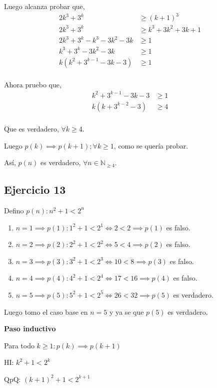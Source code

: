 Luego alcanza probar que,
\begin{align*}
    2k^3 + 3^k &\geq (k+1)^3 \\
    2k^3 + 3^k &\geq k^3 + 3k^2 + 3k + 1 \\
    2k^3 + 3^k - k^3 - 3k^2 - 3k &\geq 1 \\
    k^3 + 3^k - 3k^2 - 3k &\geq 1 \\
    k(k^2 + 3^{k-1} - 3k -3) &\geq 1 \\
\end{align*}

Ahora pruebo que,
\begin{align*}
    k^2 + 3^{k-1} - 3k -3 &\geq 1 \\
    k(k + 3^{k-2} - 3) &\geq 4 \\
\end{align*}

Que es verdadero, $\forall k \geq 4$.

Luego $p(k) \implies p(k+1); \forall k \geq 1$, como se quería probar.

Así, $p(n)$ es verdadero, $\forall n \in \mathbb{N}_{\geq 4}$.

\subsection{Ejercicio 13}

Defino $ p(n): n^2 +1 < 2^n$

\begin{enumerate}
    \item[] $ n= 1 \implies p(1): 1^2 + 1<2^1 \iff 2<2 \implies p(1)$ es falso.
    \item[] $ n= 2 \implies p(2): 2^2 + 1<2^2 \iff 5<4 \implies p(2)$ es falso.  
    \item[] $ n= 3 \implies p(3): 3^2 + 1<2^3 \iff 10<8 \implies p(3)$ es falso.
    \item[] $ n= 4 \implies p(4): 4^2 + 1<2^4 \iff 17<16 \implies p(4)$ es falso. 
    \item[] $ n= 5 \implies p(5): 5^2 + 1<2^5 \iff 26<32 \implies p(5)$ es verdadero. 
\end{enumerate}

Luego tomo el caso base en $ n = 5 $ y ya se que $p(5)$ es verdadero.

\textbf{Paso inductivo}

Para todo $k \geq 1: p(k) \implies p(k+1)$

HI: $k^2 +1 < 2^k$

QpQ: $ (k+1)^2 +1 < 2^{k+1}$

